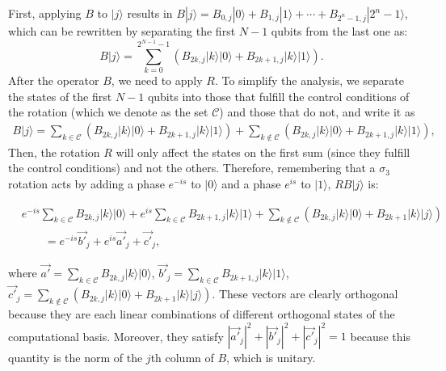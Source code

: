 \documentclass[10pt,letterpaper]{article} %
\begin{document}
First, applying $B$ to $|j\rangle$ results in $B|j\rangle = B_{0,j} |0\rangle + B_{1,j} |1 \rangle + \cdots + B_{2^n-1,j}|2^n-1\rangle$,
which can be rewritten by separating the
first $N-1$ qubits from the last one as:
\begin{equation}
B|j\rangle = \sum_{k=0}^{2^{N-1}-1} \left( B_{2k,j} |k\rangle |0\rangle + B_{2k+1,j} |k\rangle |1 \rangle \right).
\end{equation}
After the operator $B$, we need to apply $R$.
To simplify the analysis, we separate the states of
the first $N-1$ qubits into those that fulfill the control conditions of the rotation
(which we denote as the set $\mathcal{C}$)
and those that do not, and write it as
\begin{eqnarray}
B|j\rangle = \sum_{k \in \mathcal{C}} \left(B_{2k,j} |k\rangle |0\rangle + B_{2k+1,j} |k\rangle |1 \rangle \right) + \sum_{k \not\in \mathcal{C}} \left( B_{2k,j} |k\rangle |0\rangle + B_{2k+1,j}|k\rangle |1\rangle \right),
\end{eqnarray}
Then, the rotation $R$ will only affect the states on the first sum (since they fulfill the control conditions)
and not the others. Therefore,  
remembering that a $\sigma_3$ rotation acts by adding a phase $e^{-is}$ to $|0\rangle$
and a phase $e^{is}$ to $|1\rangle$, $RB|j\rangle$ is:
\begin{small}
\begin{eqnarray}
&e^{-is} \sum_{k \in \mathcal{C}} B_{2k,j} |k\rangle |0\rangle + e^{is} \sum_{k \in \mathcal{C}} B_{2k+1,j} |k\rangle |1 \rangle 
+ \sum_{k \not\in \mathcal{C}} \left( B_{2k,j} |k\rangle |0\rangle + B_{2k+1} |k\rangle |j \rangle \right)\\
& \qquad = e^{-is} \vec{b'}_j + e^{is} \vec{a'}_j + \vec{c'}_j,
\end{eqnarray}
\end{small}
where $\vec{a'} = \sum_{k \in \mathcal{C}} B_{2k,j}|k\rangle|0\rangle$, $\vec{b'}_j = \sum_{k \in \mathcal{C}} B_{2k+1,j} |k\rangle |1 \rangle$, $\vec{c'}_j =\sum_{k \not\in \mathcal{C}} \left( B_{2k,j} |k\rangle |0\rangle + B_{2k+1} |k\rangle |j \rangle \right)$.
 These vectors are clearly orthogonal because they are each linear combinations of different 
orthogonal states of the computational basis. 
Moreover, they satisfy $|\vec{a'}_j|^2 + |\vec{b'}_j|^2 + |\vec{c'}_j|^2 = 1$ because this quantity is the norm of the $j$th column of $B$, 
which is unitary.
\end{document}
